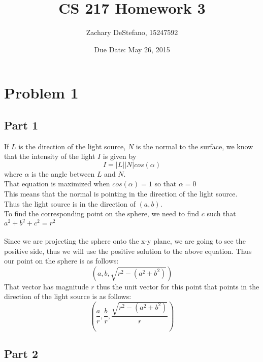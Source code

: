 \documentclass[11pt,psfig]{article}
\begin{document}
\setlength{\parskip}{1.2ex plus0.3ex minus 0.3ex}


\thispagestyle{empty} \pagestyle{myheadings} 



\title{CS 217 Homework 3}
\author{Zachary DeStefano, 15247592}
\date{Due Date: May 26, 2015}

\maketitle

\vfill\eject

\newpage

\section*{Problem 1}

\subsection{Part 1}

If $L$ is the direction of the light source, $N$ is the normal to the surface, we know that the intensity of the light $I$ is given by
\[
I = |L| |N| cos(\alpha)
\]
where $\alpha$ is the angle between $L$ and $N$.\\
That equation is maximized when $cos(\alpha)=1$ so that $\alpha=0$\\
This means that the normal is pointing in the direction of the light source. \\
Thus the light source is in the direction of $(a,b)$.\\
To find the corresponding point on the sphere, we need to find $c$ such that $a^2 + b^2 + c^2 = r^2$\\
\\
Since we are projecting the sphere onto the x-y plane, we are going to see the positive side, thus we will use the positive solution to the above equation. Thus our point on the sphere is as follows:
\[
(a,b,\sqrt{r^2-(a^2+b^2)})
\]
That vector has magnitude $r$ thus the unit vector for this point that points in the direction of the light source is as follows:
\[
(\frac{a}{r},\frac{b}{r},\frac{\sqrt{r^2-(a^2+b^2)}}{r})
\]

\subsection{Part 2}
\end{document}
